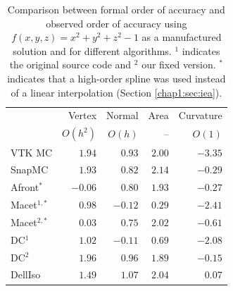 \begin{table}[b]
\centering
\begin{tabular}{lrrrr}
\hline
 & Vertex  & Normal & Area & Curvature \\
 & $O(h^2)$ & $O(h)$ & --  & $O(1)$ \\
\hline
VTK MC          &  $1.94$    & $0.93$  & $2.00$      & $-3.35$ \\
SnapMC          &  $1.93$    & $0.82$   & $2.14$     & $-0.29$ \\
Afront$^*$          &  $-0.06$ & $0.80$   & $1.93$     & $-0.27$ \\
 Macet$^{1,*}$      &  $0.98$    & $-0.12$  & $0.29$     & $-2.41$ \\
 Macet$^{2,*}$      &  $0.03$  & $0.75$   & $2.02$     & $-0.61$ \\
 DC$^1$         &  $1.02$    & $-0.11$  & $0.69$     & $-2.08$ \\
 DC$^2$         &  $1.96$    & $0.96$   & $1.89$     & $-0.15$ \\
 DellIso      &  $1.49$    & $1.07$  & $2.04$      & $0.07$ \\
\hline
\end{tabular}
\caption{Comparison between formal order of accuracy and observed
  order of accuracy using $f(x,y,z) = x^2 + y^2 + z^2 -1$ as a manufactured solution 
  and for different algorithms. $^1$ indicates the original source 
    code and $^2$ our fixed version.
   $^*$ indicates that a high-order spline was used instead of a 
linear interpolation (Section \ref{chap1:sec:iea}).}
\label{tab:results}
\end{table}



